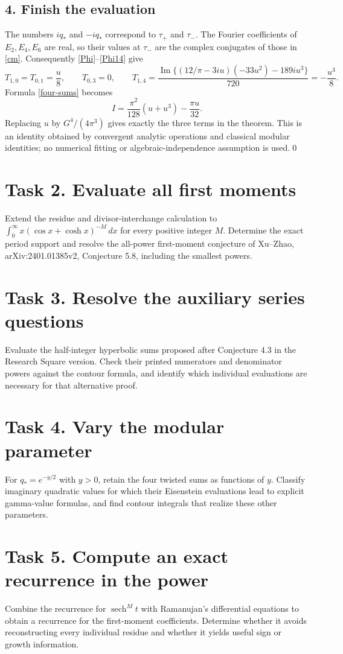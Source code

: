 \documentclass[11pt]{article}
\newcommand{\sech}{\operatorname{sech}}
\begin{document}
\subsection*{4. Finish the evaluation}
The numbers $iq_*$ and $-iq_*$ correspond to $\tau_+$ and $\tau_-$.
The Fourier coefficients of $E_2,E_4,E_6$ are real, so their values
at $\tau_-$ are the complex conjugates of those in \eqref{cm}.
Consequently \eqref{Phi}--\eqref{Phi14} give
\[
 T_{1,0}=T_{0,1}=\frac{u}{8},\qquad T_{0,3}=0,\qquad
 T_{1,4}=\frac{\operatorname{Im}\{(12/\pi-3iu)(-33u^2)
                                      -189iu^3\}}{720}
          =-\frac{u^3}{8}.
\]
Formula \eqref{four-sums} becomes
\[
 I=\frac{\pi^2}{128}(u+u^3)-\frac{\pi u}{32}.
\]
Replacing $u$ by $G^4/(4\pi^3)$ gives exactly the three terms in
the theorem. This is an identity obtained by convergent analytic
operations and classical modular identities; no numerical fitting
or algebraic-independence assumption is used.\qed

\section*{Task 2. Evaluate all first moments}
Extend the residue and divisor-interchange calculation to
$\int_0^\infty x(\cos x+\cosh x)^{-M}\,dx$ for every positive
integer $M$. Determine the exact period support and resolve the
all-power first-moment conjecture of Xu--Zhao, arXiv:2401.01385v2,
Conjecture 5.8, including the smallest powers.

\section*{Task 3. Resolve the auxiliary series questions}
Evaluate the half-integer hyperbolic sums proposed after Conjecture
4.3 in the Research Square version. Check their printed numerators
and denominator powers against the contour formula, and identify
which individual evaluations are necessary for that alternative proof.

\section*{Task 4. Vary the modular parameter}
For $q_*=e^{-y/2}$ with $y>0$, retain the four twisted sums as functions
of $y$. Classify imaginary quadratic values for which their
Eisenstein evaluations lead to explicit gamma-value formulas, and
find contour integrals that realize these other parameters.

\section*{Task 5. Compute an exact recurrence in the power}
Combine the recurrence for $\sech^M t$ with Ramanujan's differential
equations to obtain a recurrence for the first-moment coefficients.
Determine whether it avoids reconstructing every individual residue
and whether it yields useful sign or growth information.
\end{document}
